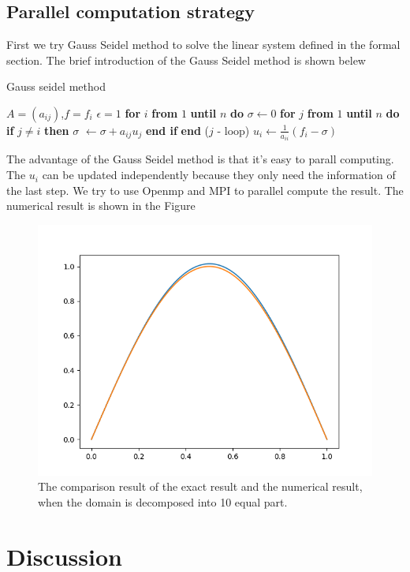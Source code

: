 \documentclass[11pt]{article}
\begin{document}
\subsection{Parallel computation strategy}
First we try Gauss Seidel method to solve the linear system defined in the formal section. The brief introduction of the Gauss Seidel method is shown belew
\begin{algorithm}
\caption{Gauss seidel method}\label{alg:gauss_seidel}
\begin{algorithmic}
\Require $A = (a_{ij})$,$f = f_i$
\State $\epsilon=1$
\State \textbf{for} $i$ \textbf{from} $1$ \textbf{until} $n$ \textbf{do}
\State \quad $\sigma \leftarrow 0$
\State \quad \textbf{for} $j$ \textbf{from} $1$ \textbf{until} $n$ \textbf{do}
\State \quad \quad \textbf{if} $j \neq i$
\textbf{then}
\State \quad  \quad  $\sigma$ $\leftarrow \sigma + a_{ij}u_j$
\State \quad  \quad \textbf{end if}
\State \quad \textbf{end} ($j$ - loop)
\State $u_i \leftarrow \frac{1}{a_{ii}} (f_i - \sigma)$
\EndWhile
\end{algorithmic}
\end{algorithm}
The advantage of the Gauss Seidel method is that it's easy to parall computing. The $u_i$ can be updated independently because they only need the information of the last step. We try to use Openmp and MPI to parallel compute the result.  
The numerical result is shown in the Figure
\begin{figure}
    \centering
    \includegraphics[width = 0.5\linewidth]{../CPP_code/1D_problem/openmp_version_gauss_seidel/result.png}
    \caption{The comparison result of the exact result and the numerical result, when the domain is decomposed into 10 equal part.}
    \label{fig:result comparison}
\end{figure}

\section{Discussion}
\end{document}
